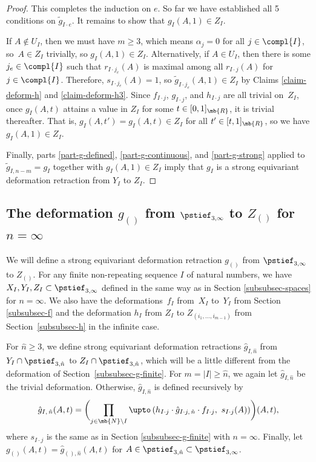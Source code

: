 \begin{proof}
This completes the induction on $e$.
So far we have established all 5 conditions on $\tilde g_{I\cdot e}$.
It remains to show that $g_I(A,1) \in Z_I$.

If $A \not\in U_I$, then we must have $m \geq 3$, which means $\alpha_j = 0$ for all $j \in \compl{I}$, so~$A \in Z_I$ trivially, so $g_I(A,1) \in Z_I$.
Alternatively, if $A \in U_I$, then there is some $j_e \in \compl{I}$ such that $r_{I\cdot j_e}(A)$ is maximal among all $r_{I\cdot j}(A)$ for $j \in \compl{I}$.
Therefore, $s_{I\cdot j_e}(A) = 1$, so $\tilde g_{I\cdot j_e}(A,1) \in Z_I$ by Claims \ref{claim-deform-h} and \ref{claim-deform-h3}. Since $f_{I\cdot j}$, $g_{I\cdot j}$, and $h_{I\cdot j}$ are all trivial on~$Z_I$, once $g_I(A,t)$ attains a value in $Z_I$ for some $t \in [0,1]_\mb{R}$, it is trivial thereafter. That is, $g_I(A,t') = g_I(A,t) \in Z_I$ for all $t' \in [t,1]_\mb{R}$, so we have $g_I(A,1) \in Z_I$.

Finally, parts \eqref{part-g-defined}, \eqref{part-g-continuous}, and \eqref{part-g-strong} applied to $\tilde g_{I,n-m} = g_I$ together with $g_I(A,1) \in Z_I$ imply that $g_I$ is a strong equivariant deformation retraction from $Y_I$ to $Z_I$.
\end{proof}

\subsection{The deformation $g_{()}$ from $\pstief_{3,\infty}$ to $Z_{()}$ for $n = \infty$}
\label{subsubsec-g-infinite}

We will define a strong equivariant deformation retraction $g_{()}$ from $\pstief_{3,\infty}$ to $Z_{()}$.
For any finite non-repeating sequence $I$ of natural numbers, we have $X_I,Y_I,Z_I \subset \pstief_{3,\infty}$ defined in the same way as in Section \ref{subsubsec-spaces} for $n = \infty$.
We also have the deformations~$f_I$ from~$X_I$ to~$Y_I$ from Section \ref{subsubsec-f} and the deformation $h_I$ from $Z_{I}$ to $Z_{(i_1,\dots,i_{m-1})}$ from Section~\ref{subsubsec-h} in the infinite case.

For $\hat n \geq 3$, we define strong equivariant deformation retractions $\hat g_{I,\hat n}$ from \hbox{$Y_I \cap \pstief_{3,\hat n}$} to $Z_I \cap \pstief_{3,\hat n}$, which will be a little different from the deformation of Section~\ref{subsubsec-g-finite}.
For $m = |I| \geq \hat n$, we again let $\hat g_{I,\hat n}$ be the trivial deformation. Otherwise, $\hat g_{I,\hat n}$ is defined recursively by
\begin{equation}\label{equation-g-infty}
\hat g_{I,\, \hat n}({A},t) = \biggl( \prod_{j \in \mb{N} \setminus I } \upto\left(h_{I \cdot j} \cdot \hat g_{I \cdot j,\, \hat n} \cdot f_{I \cdot j},\ s_{I \cdot j} ({A}) \right)\biggr) ({A},t),
\end{equation}
where $s_{I\cdot j}$ is the same as in Section \ref{subsubsec-g-finite} with $n = \infty$.
Finally, let $g_{()}(A,t) = \hat g_{(),\hat n}(A,t)$ for $A \in \pstief_{3,\hat n} \subset \pstief_{3,\infty}$.


